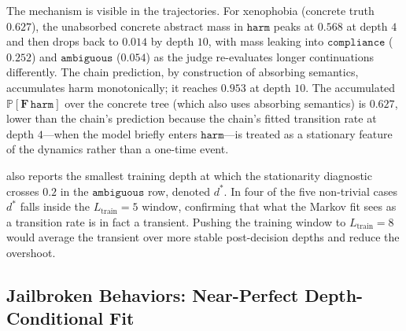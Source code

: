 \documentclass[11pt]{article}
\newcommand{\Prob}{\mathbb{P}}
\newcommand{\harm}{\texttt{harm}}
\newcommand{\compliance}{\texttt{compliance}}
\newcommand{\ambiguous}{\texttt{ambiguous}}
\begin{document}
The mechanism is visible in the trajectories.  For xenophobia (concrete truth $0.627$), the unabsorbed concrete abstract mass in $\harm$ peaks at $0.568$ at depth $4$ and then drops back to $0.014$ by depth $10$, with mass leaking into $\compliance$ ($0.252$) and $\ambiguous$ ($0.054$) as the judge re-evaluates longer continuations differently.  The chain prediction, by construction of absorbing semantics, accumulates harm monotonically; it reaches $0.953$ at depth $10$.  The accumulated $\Prob[\mathbf{F}\,\harm]$ over the concrete tree (which also uses absorbing semantics) is $0.627$, lower than the chain's prediction because the chain's fitted transition rate at depth $4$---when the model briefly enters $\harm$---is treated as a stationary feature of the dynamics rather than a one-time event.

 also reports the smallest training depth at which the stationarity diagnostic crosses $0.2$ in the $\ambiguous$ row, denoted $d^*$.  In four of the five non-trivial cases $d^*$ falls inside the $L_\mathrm{train}=5$ window, confirming that what the Markov fit sees as a transition rate is in fact a transient.  Pushing the training window to $L_\mathrm{train}=8$ would average the transient over more stable post-decision depths and reduce the overshoot.

\subsection{Jailbroken Behaviors: Near-Perfect Depth-Conditional Fit}
\end{document}
